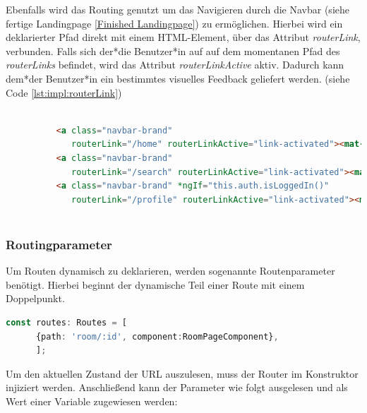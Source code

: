 Ebenfalls wird das Routing genutzt um das Navigieren durch die Navbar (siehe fertige Landingpage \ref{Finished Landingpage}) zu ermöglichen. Hierbei wird ein deklarierter Pfad direkt mit einem HTML-Element, über das Attribut \emph{routerLink}, verbunden. Falls sich der*die Benutzer*in auf auf dem momentanen Pfad des \emph{routerLinks} befindet, wird das Attribut \emph{routerLinkActive} aktiv. Dadurch kann dem*der Benutzer*in ein bestimmtes visuelles Feedback geliefert werden.  (siehe Code \ref{lst:impl:routerLink})

\begin{lstlisting}[caption={Routing über einen routerLink},language=HTML,label=lst:impl:routerLink]
    
          <a class="navbar-brand"
             routerLink="/home" routerLinkActive="link-activated"><mat-icon>home</mat-icon>Home</a>
          <a class="navbar-brand"
             routerLink="/search" routerLinkActive="link-activated"><mat-icon>search</mat-icon>Search</a>
          <a class="navbar-brand" *ngIf="this.auth.isLoggedIn()"
             routerLink="/profile" routerLinkActive="link-activated"><mat-icon>person</mat-icon>Profile</a>
       
\end{lstlisting}

\subsubsection{Routingparameter}
\label{Routingparameter}
Um Routen dynamisch zu deklarieren, werden sogenannte Routenparameter benötigt. Hierbei beginnt der dynamische Teil einer Route mit einem Doppelpunkt. 


\begin{lstlisting}[caption={Routingparamter in der 3D-Gallery},language=TypeScript,label=lst:impl:routingparameter]
    const routes: Routes = [
      {path: 'room/:id', component:RoomPageComponent},
      ];    
\end{lstlisting}

Um den aktuellen Zustand der URL auszulesen, muss der Router im Konstruktor injiziert werden. Anschließend kann der Parameter wie folgt ausgelesen und als Wert einer Variable zugewiesen werden:

